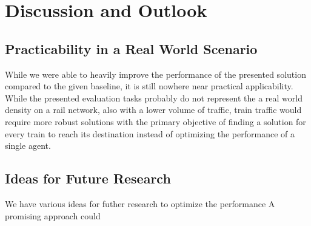 %
%

\chapter{Discussion and Outlook}
\label{chap.diskussion}
\section{Practicability in a Real World Scenario}\label{discussion_real_world}
While we were able to heavily improve the performance of the presented solution compared to the given baseline, it is still nowhere near practical applicability. While the presented evaluation tasks probably do not represent the a real world density on a rail network, also with a lower volume of traffic, train traffic would require more robust solutions with the primary objective of finding a solution for every train to reach its destination instead of optimizing the performance of a single agent.
\section{Ideas for Future Research}\label{discussion_research}
We have various ideas for futher research to optimize the performance
A promising approach could 
